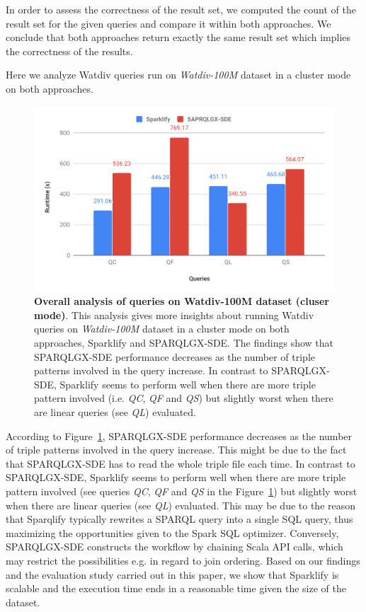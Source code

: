 In order to assess the correctness of the result set, we computed the count of the result set for the given queries and compare it within both approaches.
We conclude that both approaches return exactly the same result set which implies the correctness of the results.

Here we analyze Watdiv queries run on \textit{Watdiv-100M} dataset in a cluster mode on both approaches.

\begin{figure}
  \includegraphics[width=1.0\columnwidth]{images/6_scalable_rdf_querying/sparklify-overall-analysis.pdf}
    \caption{\textbf{Overall analysis of queries on Watdiv-100M dataset (cluser mode)}.
    This analysis gives more insights about running Watdiv queries on \textit{Watdiv-100M} dataset in a cluster mode on both approaches, Sparklify and SPARQLGX-SDE.
    The findings show that SPARQLGX-SDE performance decreases as the number of triple patterns involved in the query increase.
    In contrast to SPARQLGX-SDE, Sparklify seems to perform well when there are more triple pattern involved (i.e. \textit{QC}, \textit{QF} and \textit{QS}) but slightly worst when there are linear queries (see \textit{QL}) evaluated. }
    \label{fig:sparklify-overall-analysis}
\end{figure}

According to Figure~\ref{fig:sparklify-overall-analysis}, SPARQLGX-SDE performance decreases as the number of triple patterns involved in the query increase.
This might be due to the fact that SPARQLGX-SDE has to read the whole triple file each time.
In contrast to SPARQLGX-SDE, Sparklify seems to perform well when there are more triple pattern involved (see queries \textit{QC}, \textit{QF} and \textit{QS} in the Figure~\ref{fig:sparklify-overall-analysis}) but slightly worst when there are linear queries (see \textit{QL}) evaluated. 
This may be due to the reason that Sparqlify typically rewrites a \gls{SPARQL} query into a single SQL query, thus maximizing the opportunities given to the Spark SQL optimizer. Conversely, SPARQLGX-SDE constructs the workflow by chaining Scala API calls, which may restrict the possibilities e.g. in regard to join ordering.
Based on our findings and the evaluation study carried out in this paper, we show that Sparklify is scalable and the execution time ends in a reasonable time given the size of the dataset.

